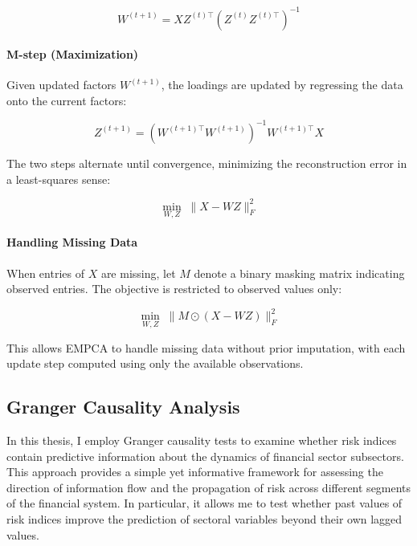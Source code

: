 \documentclass[12pt,a4paper]{report}
\begin{document}
\begin{equation}
W^{(t+1)} = XZ^{(t)\top} \left(Z^{(t)}Z^{(t)\top}\right)^{-1}
\end{equation}

\paragraph{M-step (Maximization)}
Given updated factors $W^{(t+1)}$, the loadings are updated by regressing 
the data onto the current factors:

\begin{equation}
Z^{(t+1)} = \left(W^{(t+1)\top}W^{(t+1)}\right)^{-1} W^{(t+1)\top}X
\end{equation}

The two steps alternate until convergence, minimizing the reconstruction 
error in a least-squares sense:

\begin{equation}
\min_{W,Z} \; \|X - WZ\|_F^2
\end{equation}

\paragraph{Handling Missing Data}
When entries of $X$ are missing, let $M$ denote a binary masking matrix 
indicating observed entries. The objective is restricted to observed 
values only:

\begin{equation}
\min_{W,Z} \; \|M \odot (X - WZ)\|_F^2
\end{equation}

This allows EMPCA to handle missing data without prior imputation, with 
each update step computed using only the available observations.




\subsection{Granger Causality Analysis}

In this thesis, I employ Granger causality tests to examine whether risk indices contain predictive
information about the dynamics of financial sector subsectors. This approach provides a simple yet
informative framework for assessing the direction of information flow and the propagation of risk
across different segments of the financial system. In particular, it allows me to test whether past
values of risk indices improve the prediction of sectoral variables beyond their own lagged values.
\end{document}
